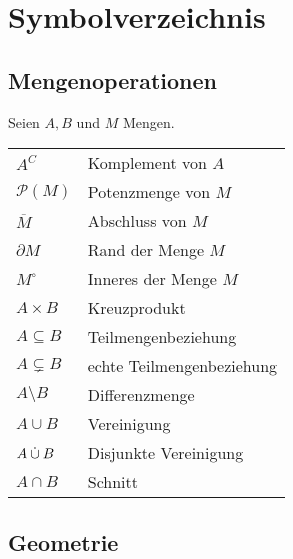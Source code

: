 \twocolumn
\chapter*{Symbolverzeichnis}
\section*{Mengenoperationen}

Seien $A, B$ und $M$ Mengen.

\settowidth{}
\setlength\mylengthb{\dimexpr\columnwidth-\mylengtha-2\tabcolsep\relax}

\begin{xtabular}{@{} p{\mylengtha} P{\mylengthb} @{}}
$A^C $           & Komplement von $A$\\
$\mathcal{P}(M)$ & Potenzmenge von $M$\\
$\overline{M}$   & Abschluss von $M$\\
$\partial M$     & Rand der Menge $M$\\
$M^\circ$        & Inneres der Menge $M$\\
$A \times B$     & Kreuzprodukt\\
$A \subseteq B$  & Teilmengenbeziehung\\
$A \subsetneq B$ & echte Teilmengenbeziehung\\
$A \setminus B$  & Differenzmenge\\
$A \cup B$       & Vereinigung\\
$A \mathbin{\dot{\cup}} B$      & Disjunkte Vereinigung\\
$A \cap B$       & Schnitt\\
\end{xtabular}
\section*{Geometrie}

